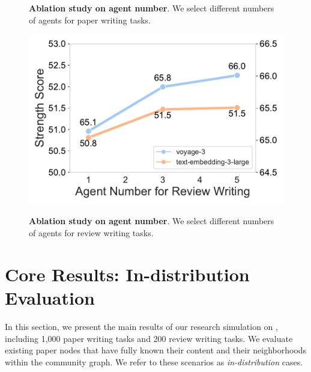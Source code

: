 \begin{figure}[t]
\begin{minipage}[t]{0.31\linewidth}
        \caption{\textbf{Ablation study on agent number}. We select different numbers of agents for paper writing tasks.}
        \vspace{-2.5mm}
        \label{paper_writing_researcher_num}
    \end{minipage}\hfill
    \begin{minipage}[t]{0.31\linewidth}
        \centering
        \includegraphics[width=\linewidth]{./figs/number_ablation_strength_dual_axis.pdf}
        \par\vspace{-2.5mm}
        \caption{\textbf{Ablation study on agent number}. We select different numbers of agents for review writing tasks.}
        \vspace{-2.5mm}
        \label{review_writing_researcher_num}
    \end{minipage}
\end{figure}


\vspace{-6mm}
\section{Core Results: In-distribution Evaluation}
\label{sec:core-results}

In this section, we present the main results of our research simulation on \benchname, including 1,000 paper writing tasks and 200 review writing tasks. We evaluate existing paper nodes that have fully known their content and their neighborhoods within the community graph. We refer to these scenarios as \textit{in-distribution} cases.


